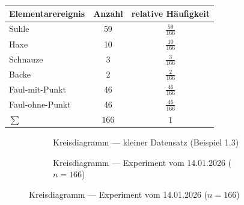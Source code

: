 \begin{bsp}[Schweinewürfeln]
    \begin{mytable}
        \begin{tabular}{lcc}
            \hline
            \textbf{Elementarereignis} & \textbf{Anzahl} & \textbf{relative Häufigkeit} \\
            \hline
            Suhle                      & 59              & $\tfrac{59}{166}$            \\
            Haxe                       & 10              & $\tfrac{10}{166}$            \\
            Schnauze                   & 3               & $\tfrac{3}{166}$             \\
            Backe                      & 2               & $\tfrac{2}{166}$             \\
            Faul-mit-Punkt             & 46              & $\tfrac{46}{166}$            \\
            Faul-ohne-Punkt            & 46              & $\tfrac{46}{166}$            \\
            \hline
            $\sum$                     & $166$           & $1$                          \\
            \hline
        \end{tabular}
    \end{mytable}
\end{bsp}

\begin{figure}[H]
    \centering
    \begin{subfigure}[t]{0.48\textwidth}
        \centering
        \caption{Kreisdiagramm --- kleiner Datensatz (Beispiel 1.3)}
    \end{subfigure}
    \hfill
    \begin{subfigure}[t]{0.48\textwidth}
        \centering
        \caption{ Kreisdiagramm --- Experiment vom 14.01.2026 ($n=166$)}
    \end{subfigure}\label{fig:figure4}
\end{figure}

